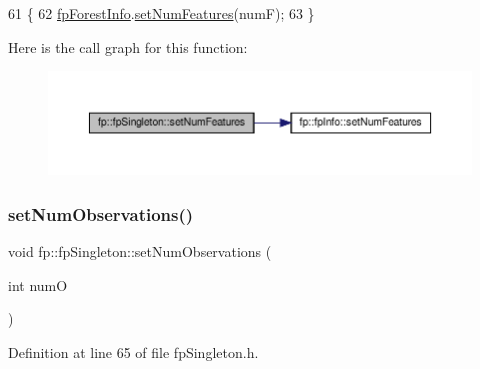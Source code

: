 \begin{DoxyCode}
61                                                 \{
62                 \hyperlink{classfp_1_1fpSingleton_a85965009befa72a749ae498fa5b6ccfa}{fpForestInfo}.\hyperlink{classfp_1_1fpInfo_a69ef99f2ec9ef74dd3787bc33ffb05d0}{setNumFeatures}(numF);
63             \}
\end{DoxyCode}
Here is the call graph for this function\+:\nopagebreak
\begin{figure}[H]
\begin{center}
\leavevmode
\includegraphics[width=350pt]{classfp_1_1fpSingleton_a5a35867349f6d172f77af7026fdaecbe_cgraph}
\end{center}
\end{figure}
\mbox{\label{classfp_1_1fpSingleton_acf821a8fda9d3296cde7dc33b9c1ddb5}} 
\subsubsection{\texorpdfstring{set\+Num\+Observations()}{setNumObservations()}}
{\footnotesize\ttfamily void fp\+::fp\+Singleton\+::set\+Num\+Observations (\begin{DoxyParamCaption}\item[{int}]{numO }\end{DoxyParamCaption})\hspace{0.3cm}{\ttfamily [inline]}}



Definition at line 65 of file fp\+Singleton.\+h.


